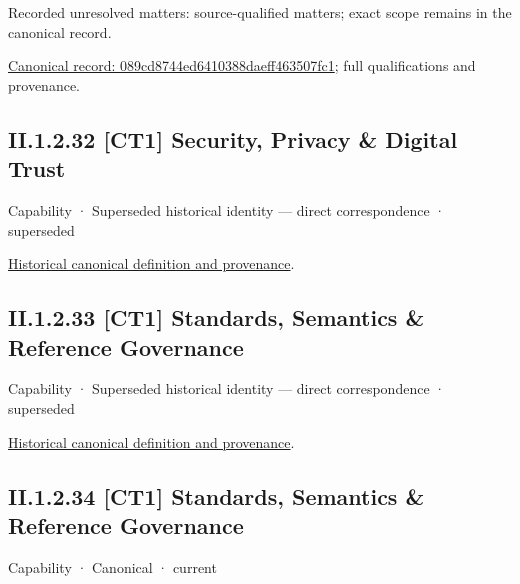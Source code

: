 {\small Recorded unresolved matters: source-qualified matters; exact scope remains in the canonical record.}\par
{\footnotesize \href{../../../../continuum/strategy/capability/089cd8744ed6410388daeff463507fc1.md}{Canonical record: 089cd8744ed6410388daeff463507fc1}; full qualifications and provenance.}\par
\subsection*{II.1.2.32 [CT1] Security, Privacy \& Digital Trust}
\label{navigation:II.1.2.32}

\label{element:b01441b2f5584fc2b9c3988643a7c93b}
{\small Capability · Superseded historical identity — direct correspondence · superseded}\par
\href{../../../../continuum/strategy/capability/b01441b2f5584fc2b9c3988643a7c93b.md}{Historical canonical definition and provenance}.\par
\subsection*{II.1.2.33 [CT1] Standards, Semantics \& Reference Governance}
\label{navigation:II.1.2.33}

\label{element:3b65a3d007f54aa9b875e655475e1786}
{\small Capability · Superseded historical identity — direct correspondence · superseded}\par
\href{../../../../continuum/strategy/capability/3b65a3d007f54aa9b875e655475e1786.md}{Historical canonical definition and provenance}.\par
\subsection*{II.1.2.34 [CT1] Standards, Semantics \& Reference Governance}
\label{navigation:II.1.2.34}

\label{element:5ffeb7401d314f06b05d79c3aff98242}
{\small Capability · Canonical · current}\par

